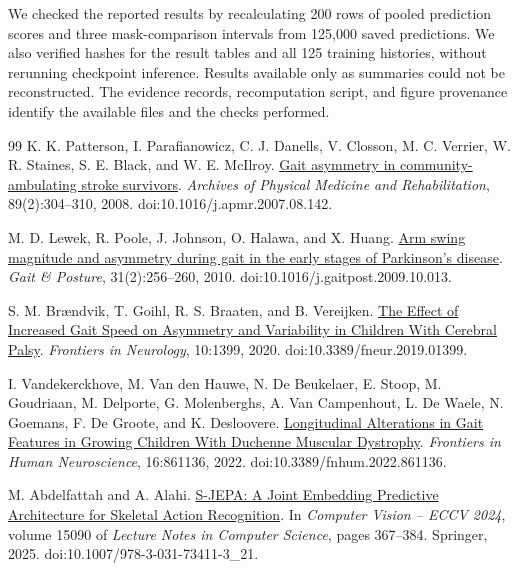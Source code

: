 \documentclass{article}
\begin{document}
We checked the reported results by recalculating 200 rows of pooled prediction scores and three mask-comparison intervals from 125,000 saved predictions. We also verified hashes for the result tables and all 125 training histories, without rerunning checkpoint inference. Results available only as summaries could not be reconstructed. The {evidence records}, {recomputation script}, and {figure provenance} identify the available files and the checks performed.
\label{physworld:main-last}
\clearpage
\label{physworld:references-start}
{\renewcommand{\bibfont}{\small}
\begin{thebibliography}{99}
 K. K. Patterson, I. Parafianowicz, C. J. Danells, V. Closson, M. C. Verrier, W. R. Staines, S. E. Black, and W. E. McIlroy. \href{https://pubmed.ncbi.nlm.nih.gov/18226655/}{Gait asymmetry in community-ambulating stroke survivors}. \emph{Archives of Physical Medicine and Rehabilitation}, 89(2):304--310, 2008. doi:10.1016/j.apmr.2007.08.142.

 M. D. Lewek, R. Poole, J. Johnson, O. Halawa, and X. Huang. \href{https://pubmed.ncbi.nlm.nih.gov/19945285/}{Arm swing magnitude and asymmetry during gait in the early stages of Parkinson's disease}. \emph{Gait \& Posture}, 31(2):256--260, 2010. doi:10.1016/j.gaitpost.2009.10.013.

 S. M. Brændvik, T. Goihl, R. S. Braaten, and B. Vereijken. \href{https://pubmed.ncbi.nlm.nih.gov/32082235/}{The Effect of Increased Gait Speed on Asymmetry and Variability in Children With Cerebral Palsy}. \emph{Frontiers in Neurology}, 10:1399, 2020. doi:10.3389/fneur.2019.01399.

 I. Vandekerckhove, M. Van den Hauwe, N. De Beukelaer, E. Stoop, M. Goudriaan, M. Delporte, G. Molenberghs, A. Van Campenhout, L. De Waele, N. Goemans, F. De Groote, and K. Desloovere. \href{https://pmc.ncbi.nlm.nih.gov/articles/PMC9201072/}{Longitudinal Alterations in Gait Features in Growing Children With Duchenne Muscular Dystrophy}. \emph{Frontiers in Human Neuroscience}, 16:861136, 2022. doi:10.3389/fnhum.2022.861136.

 M. Abdelfattah and A. Alahi. \href{https://www.ecva.net/papers/eccv_2024/papers_ECCV/papers/04755.pdf}{S-JEPA: A Joint Embedding Predictive Architecture for Skeletal Action Recognition}. In \emph{Computer Vision -- ECCV 2024}, volume 15090 of \emph{Lecture Notes in Computer Science}, pages 367--384. Springer, 2025. doi:10.1007/978-3-031-73411-3\_21.


\end{thebibliography}}
\end{document}
